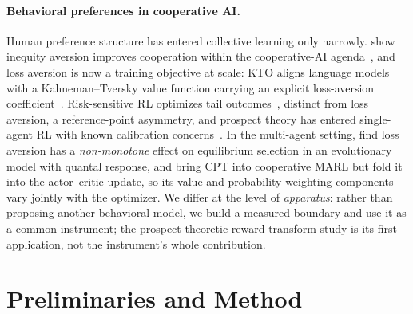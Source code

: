 \documentclass[letterpaper]{article} %
\theoremstyle{plain}
\begin{document}
\paragraph{Behavioral preferences in cooperative AI.}
Human preference structure has entered collective learning only narrowly.
\citet{hughes2018inequity} show inequity aversion improves cooperation within the cooperative-AI
agenda~\citep{dafoe2020open,hammond2025multiagent,barfuss2020caring}, and loss aversion is now a
training objective at scale: KTO aligns language models with a Kahneman--Tversky value function
carrying an explicit loss-aversion coefficient~\citep{ethayarajh2024kto}. Risk-sensitive RL
optimizes tail outcomes~\citep{qiu2021rmix,xie2023riskq,prashanth2014cvar,tamar2015optimizing},
distinct from loss aversion, a reference-point asymmetry, and prospect theory has entered
single-agent RL with known calibration
concerns~\citep{prashanth2016cumulative,rabin2000risk,tversky1992}. In the multi-agent setting,
\citet{mengesha2025} find loss aversion has a \emph{non-monotone} effect on equilibrium selection in
an evolutionary model with quantal response, and \citet{lalmohammed2025} bring CPT into cooperative
MARL but fold it into the actor--critic update, so its value and probability-weighting components
vary jointly with the optimizer. We differ at the level of \emph{apparatus}: rather than proposing
another behavioral model, we build a measured boundary and use it as a common instrument; the
prospect-theoretic reward-transform study is its first application, not the instrument's whole
contribution.

\section{Preliminaries and Method}
\label{sec:method}
\end{document}
